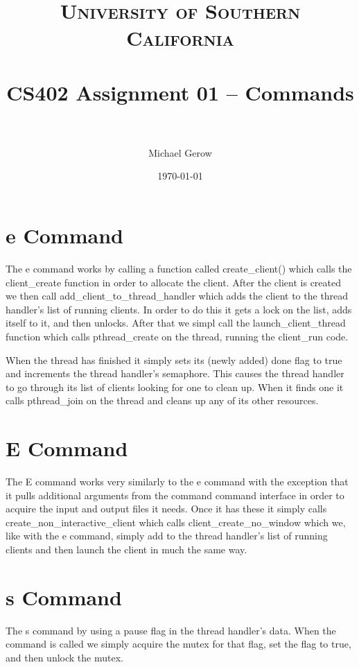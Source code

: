 \documentclass[paper=a4, fontsize=11pt]{scrartcl} %
\title{	
\normalfont \normalsize 
\textsc{University of Southern California} \\ [25pt] %
\horrule{0.5pt} \\[0.4cm] %
\huge CS402 Assignment 01 -- Commands \\ %
\horrule{2pt} \\[0.5cm] %
}
\author{Michael Gerow} %
\date{\normalsize\today} %
\numberwithin{equation}{section} %
\numberwithin{figure}{section} %
\numberwithin{table}{section} %
\begin{document}
\maketitle %


\section{e Command}

The e command works by calling a function called create_client() which calls the client_create function in order to allocate the client.  After the client is created we then call add_client_to_thread_handler which adds the client to the thread handler's list of running clients.  In order to do this it gets a lock on the list, adds itself to it, and then unlocks.  After that we simpl call the launch_client_thread function which calls pthread_create on the thread, running the client_run code.

When the thread has finished it simply sets its (newly added) done flag to true and increments the thread handler's semaphore. This causes the thread handler to go through its list of clients looking for one to clean up. When it finds one it calls pthread_join on the thread and cleans up any of its other resources.

\section{E Command}

The E command works very similarly to the e command with the exception that it pulls additional arguments from the command command interface in order to acquire the input and output files it needs. Once it has these it simply calls create_non_interactive_client which calls client_create_no_window which we, like with the e command, simply add to the thread handler's list of running clients and then launch the client in much the same way.

\section{s Command}

The s command by using a pause flag in the thread handler's data. When the command is called we simply acquire the mutex for that flag, set the flag to true, and then unlock the mutex.
\end{document}
